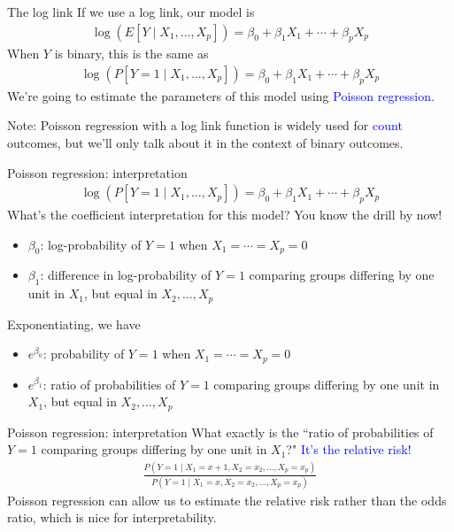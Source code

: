 \documentclass[10pt,t]{beamer}
\begin{document}
\begin{frame}{The log link}
	If we use a log link, our model is
	\begin{align*}
		\log(E[Y \mid X_1,\dots,X_p]) = \beta_0 + \beta_1X_1 + \cdots + \beta_pX_p
	\end{align*}
	When $Y$ is binary, this is the same as
	\begin{align*}
		\log(P[Y = 1 \mid X_1,\dots,X_p]) = \beta_0 + \beta_1X_1 + \cdots + \beta_pX_p
	\end{align*}
	We're going to estimate the parameters of this model using \textcolor{blue}{Poisson regression}. 
	\vfill
	\begin{footnotesize}Note: Poisson regression with a log link function is widely used for \textcolor{blue}{count} outcomes, but we'll only talk about it in the context of binary outcomes. \end{footnotesize}
\end{frame}

\begin{frame}{Poisson regression: interpretation}
		\begin{align*}
		\log(P[Y = 1 \mid X_1,\dots,X_p]) = \beta_0 + \beta_1X_1 + \cdots + \beta_pX_p
	\end{align*}
	What's the coefficient interpretation for this model? You know the drill by now!
	\begin{itemize}
		\item $\beta_0$: log-probability of $Y = 1$ when $X_1 = \cdots = X_p = 0$ 
		\item $\beta_1$: difference in log-probability of $Y = 1$ comparing groups differing by one unit in $X_1$, but equal in $X_2,\dots,X_p$
	\end{itemize}
	Exponentiating, we have
	\begin{itemize}
			\item $e^{\beta_0}$: probability of $Y = 1$ when $X_1 = \cdots = X_p = 0$ 
	\item $e^{\beta_1}$: ratio of probabilities of $Y = 1$ comparing groups differing by one unit in $X_1$, but equal in $X_2,\dots,X_p$
	\end{itemize}
\end{frame}

\begin{frame}{Poisson regression: interpretation}
	What exactly is the ``ratio of probabilities of $Y = 1$ comparing groups differing by one unit in $X_1$?" \textcolor{blue}{It's the relative risk!}
	\begin{align*}
		\frac{P(Y = 1 \mid X_1 = x+1, X_2 = x_2, \dots, X_p = x_p)}{P(Y = 1 \mid X_1 = x, X_2 = x_2, \dots, X_p = x_p)}
	\end{align*}
	Poisson regression can allow us to estimate the relative risk rather than the odds ratio, which is nice for interpretability. 
\end{frame}
\end{document}
